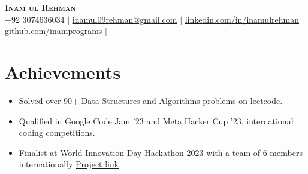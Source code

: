 \documentclass[letterpaper,11pt]{article}
\newcommand{\resumeItem}[1]{
  \item\small{
    {#1 \vspace{-2pt}}
  }
}
\newcommand{\resumeSubHeadingListStart}{\begin{itemize}[leftmargin=0.15in, label={}]}
\newcommand{\resumeSubHeadingListEnd}{\end{itemize}}
\newcommand{\resumeItemListStart}{\begin{itemize}}
\newcommand{\resumeItemListEnd}{\end{itemize}\vspace{-5pt}}
\begin{document}

\begin{center}
  \textbf{\Huge \scshape Inam ul Rehman } \\ \vspace{1pt}
  \small +92 3074636034 $|$
  \href{mailto:inamul09rehman@gmail.com}{\underline{inamul09rehman@gmail.com}} $|$
  \href{https://www.linkedin.com/in/inamulrehman/}{\underline{linkedin.com/in/inamulrehman}} $|$
  \href{https://github.com/inamprograms}{\underline{github.com/inamprograms}} $|$
\end{center}

\section{Achievements}
\resumeItemListStart
\resumeItem{Solved over 90+ Data Structures and Algorithms problems on {\href{https://leetcode.com/inamulrehman09/}{\underline{leetcode}}}.}
\resumeItem{Qualified in Google Code Jam '23 and Meta Hacker Cup '23, international coding competitions.}
\resumeItem{Finalist at World Innovation Day Hackathon 2023 with a team of 6 members internationally
    {\href{https://github.com/inamprograms/EquiDonate}{\underline{Project link}}}}
\resumeItemListEnd
\end{document}
